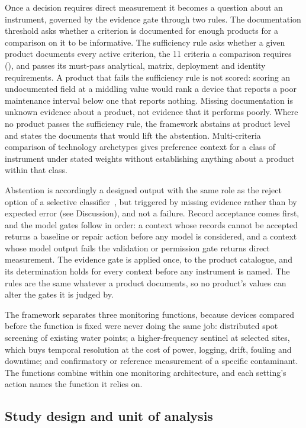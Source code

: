 \documentclass[10pt,letterpaper]{article}
\begin{document}
Once a decision requires direct measurement it becomes a question about an instrument, governed by the evidence gate through two rules. The documentation threshold asks whether a criterion is documented for enough products for a comparison on it to be informative. The sufficiency rule asks whether a given product documents every active criterion, the 11 criteria a comparison requires (), and passes its must-pass analytical, matrix, deployment and identity requirements. A product that fails the sufficiency rule is not scored: scoring an undocumented field at a middling value would rank a device that reports a poor maintenance interval below one that reports nothing. Missing documentation is unknown evidence about a product, not evidence that it performs poorly. Where no product passes the sufficiency rule, the framework abstains at product level and states the documents that would lift the abstention. Multi-criteria comparison of technology archetypes gives preference context for a class of instrument under stated weights without establishing anything about a product within that class.

Abstention is accordingly a designed output with the same role as the reject option of a selective classifier~\cite{Geifman2017}, but triggered by missing evidence rather than by expected error (see Discussion), and not a failure. Record acceptance comes first, and the model gates follow in order: a context whose records cannot be accepted returns a baseline or repair action before any model is considered, and a context whose model output fails the validation or permission gate returns direct measurement. The evidence gate is applied once, to the product catalogue, and its determination holds for every context before any instrument is named. The rules are the same whatever a product documents, so no product's values can alter the gates it is judged by.

The framework separates three monitoring functions, because devices compared before the function is fixed were never doing the same job: distributed spot screening of existing water points; a higher-frequency sentinel at selected sites, which buys temporal resolution at the cost of power, logging, drift, fouling and downtime; and confirmatory or reference measurement of a specific contaminant. The functions combine within one monitoring architecture, and each setting's action names the function it relies on.

\subsection*{Study design and unit of analysis}
\end{document}

